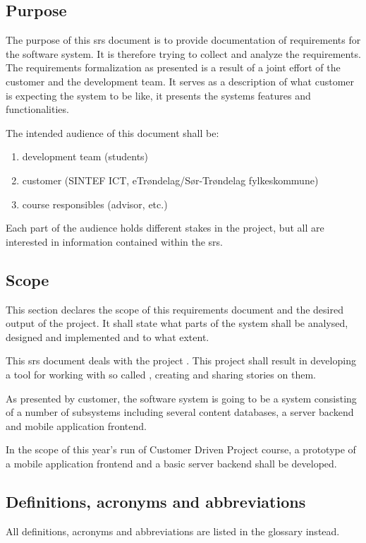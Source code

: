 \documentclass[11pt]{book}
\begin{document}
\subsection{Purpose}
The purpose of this \gls{srs} document is to provide documentation of requirements for the \systemname software system. It is therefore trying to collect and analyze the requirements. The requirements formalization as presented is a result of a joint effort of the customer and the development team. It serves as a description of what customer is expecting the system to be like, it presents the systems features and functionalities.

The intended audience of this document shall be:

\begin{enumerate}
  \item development team (students)
  \item customer (SINTEF ICT, eTrøndelag/Sør-Trøndelag fylkeskommune)
  \item course responsibles (advisor, etc.)
\end{enumerate}

Each part of the audience holds different stakes in the project, but all are interested in information contained within the \gls{srs}.

\subsection{Scope}
This section declares the scope of this requirements document and the desired output of the project. It shall state what parts of the system shall be analysed, designed and implemented and to what extent.

This \gls{srs} document deals with the project \fullprojectname. This project shall result in developing a tool for working with so called \wallentityp, creating and sharing stories on them. %

As presented by customer, the \systemname software system is going to be a system consisting of a number of subsystems including several content databases, a server backend and mobile application frontend.

In the scope of this year's run of Customer Driven Project course, a prototype of a mobile application frontend and a basic server backend shall be developed.

\subsection{Definitions, acronyms and abbreviations}
All definitions, acronyms and abbreviations are listed in the glossary instead.
\end{document}
